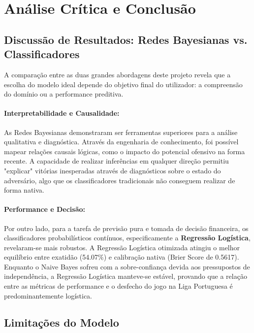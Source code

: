 \documentclass[10pt]{article}
\begin{document}
\section{Análise Crítica e Conclusão}

\subsection{Discussão de Resultados: Redes Bayesianas vs. Classificadores}

A comparação entre as duas grandes abordagens deste projeto revela que a escolha do modelo ideal depende do objetivo final do utilizador: a compreensão do domínio ou a performance preditiva.

\paragraph{Interpretabilidade e Causalidade:} As Redes Bayesianas demonstraram ser ferramentas superiores para a análise qualitativa e diagnóstica. Através da engenharia de conhecimento, foi possível mapear relações causais lógicas, como o impacto do potencial ofensivo na forma recente. A capacidade de realizar inferências em qualquer direção permitiu "explicar" vitórias inesperadas através de diagnósticos sobre o estado do adversário, algo que os classificadores tradicionais não conseguem realizar de forma nativa.

\paragraph{Performance e Decisão:} Por outro lado, para a tarefa de previsão pura e tomada de decisão financeira, os classificadores probabilísticos contínuos, especificamente a \textbf{Regressão Logística}, revelaram-se mais robustos. A Regressão Logística otimizada atingiu o melhor equilíbrio entre exatidão (54.07\%) e calibração nativa (Brier Score de 0.5617). Enquanto o Naive Bayes sofreu com a sobre-confiança devida aos pressupostos de independência, a Regressão Logística manteve-se estável, provando que a relação entre as métricas de performance e o desfecho do jogo na Liga Portuguesa é predominantemente logística.

\subsection{Limitações do Modelo}
\end{document}
